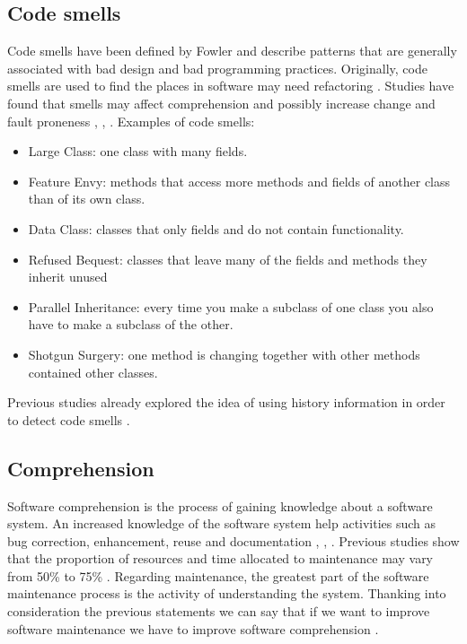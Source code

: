 \documentclass[12pt, a4paper, twoside]{report}
\begin{document}
\subsection{Code smells }
Code smells have been defined by Fowler \cite{bookFowler} and describe patterns that are generally associated with bad design and bad programming practices.
Originally, code smells are used to find the places in software may need refactoring \cite{articlesmells}. Studies have found that smells may affect comprehension and possibly increase change and fault proneness \cite{5741260}, \cite{5328703}, \cite{articlefault-proneness}.
Examples of code smells:
\begin{itemize}
	\item Large Class: one class with many fields.
	\item Feature Envy:  methods that access more methods and fields of another class than of its own class.
	\item Data Class: classes that only fields and do not contain functionality.
	\item Refused Bequest: classes that leave many of the fields and methods they inherit unused
	\item Parallel Inheritance: every time you make a subclass of one class you also have to make a subclass of the other.
	\item Shotgun Surgery: one method is changing together with other methods contained other classes.
\end{itemize}

Previous studies already explored the idea of using history information in order to detect code smells \cite{6963448}. 

\subsection{Comprehension}
Software comprehension is the process of gaining knowledge about a software system.
An increased knowledge of the software system help activities such as bug correction, enhancement, reuse and documentation \cite{Comprehension}, \cite{1199197}, \cite{2003:XLC:851042.857028}.
Previous studies show that the proportion of resources and time allocated to maintenance may vary from 50\% to 75\% \cite{articleLientz}.
Regarding maintenance, the greatest part of the software maintenance process is the activity of understanding the
system. 
Thanking into consideration the previous statements we can say that if we want to improve software maintenance we have to improve software comprehension \cite{article-cognitive-processes}.
\end{document}
